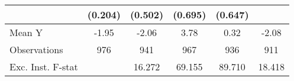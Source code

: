 {\begin{tabular}{l*{5}{c}}
            &     (0.204)         &     (0.502)         &     (0.695)         &     (0.647)         &                     \\
\midrule
Mean Y      &       -1.95         &       -2.06         &        3.78         &        0.32         &       -2.08         \\
Observations&         976         &         941         &         967         &         936         &         911         \\
Exc. Inst. F-stat&                     &      16.272         &      69.155         &      89.710         &      18.418         \\
\bottomrule
\end{tabular}
}
